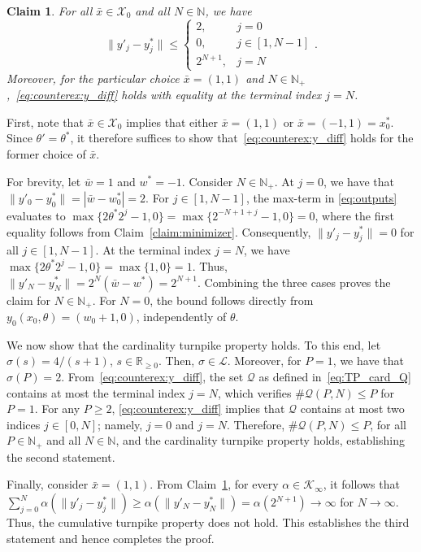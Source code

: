 \documentclass[a4paper,fleqn]{cas-dc}
\newtheorem{claim}{Claim}
\begin{document}
\begin{pf}
	\begin{claim}\label{claim:ydiff}
		For all $\bar{x}\in\mathcal{X}_0$ and all $N\in\mathbb{N}$, we have
		\begin{equation}\label{eq:counterex:y_diff}
			\|y'_j-y^*_j\| \leq
			\begin{cases}
				2, & j = 0 \\
				0, & j \in [1,N-1] \\
				2^{N+1}, & j=N
			\end{cases}.
		\end{equation}
		Moreover, for the particular choice $\bar{x}=(1,1)$ and $N\in\mathbb{N}_+$,~\eqref{eq:counterex:y_diff} holds with equality at the terminal index $j=N$.
	\end{claim}
	\begin{pf}
		First, note that $\bar{x}\in\mathcal{X}_0$ implies that either $\bar{x}=(1,1)$ or $\bar{x}=(-1,1)=x_0^*$. Since $\theta'=\theta^*$, it therefore suffices to show that~\eqref{eq:counterex:y_diff} holds for the former choice of $\bar{x}$.

		For brevity, let $\bar{w}=1$ and $w^*=-1$. Consider $N\in\mathbb{N}_+$.
		At $j=0$, we have that $\|y'_0-y^*_0\| = |\bar{w}-w_0^*| = 2$.
		For $j\in[1,N-1]$, the max-term in \eqref{eq:outputs} evaluates to $\max\{2\theta^*2^j-1,0\}  = \max\{2^{-N+1+j}-1,0\} = 0$, where the first equality follows from Claim~\ref{claim:minimizer}. Consequently, $\|y'_j-y^*_j\| = 0$ for all $j\in[1,N-1]$.
		At the terminal index $j=N$, we have $\max\{2\theta^*2^j-1,0\} = \max\{1,0\} = 1$. Thus, $\|y'_N-y^*_N\| = 2^N(\bar{w}-w^*) = 2^{N+1}$.
		Combining the three cases proves the claim for $N\in\mathbb{N}_+$. For $N=0$, the bound follows directly from $y_0(x_0,\theta)=(w_0+1,0)$, independently of $\theta$.
	\end{pf}
	
	We now show that the cardinality turnpike property holds. To this end, let $\sigma(s) = 4/(s+1)$, $s\in\mathbb{R}_{\geq0}$. Then, $\sigma\in\mathcal{L}$. Moreover, for $P=1$, we have that $\sigma(P) = 2$. From~\eqref{eq:counterex:y_diff}, the set $\mathcal{Q}$ as defined in~\eqref{eq:TP_card_Q} contains at most the terminal index $j=N$, which verifies $\#\mathcal{Q}(P,N)\leq P$ for $P=1$.
	For any $P\geq 2$, \eqref{eq:counterex:y_diff} implies that $\mathcal{Q}$ contains at most two indices $j\in[0,N]$; namely, $j=0$ and $j=N$.
	Therefore, $\#\mathcal{Q}(P,N)\leq P$, for all $P\in\mathbb{N}_+$ and all $N\in\mathbb{N}$, and the cardinality turnpike property holds, establishing the second statement.
	
	Finally, consider $\bar{x}=(1,1)$. From Claim~\ref{claim:ydiff}, for every $\alpha\in\mathcal{K}_\infty$, it follows that $\sum_{j=0}^N\alpha(\|y'_j-y^*_j\|) \geq \alpha(\|y'_N-y^*_N\|)= \alpha(2^{N+1}) \to \infty$ for $N\to\infty$. Thus, the cumulative turnpike property does not hold.
	This establishes the third statement and hence completes the proof.
\end{pf}
\end{document}
